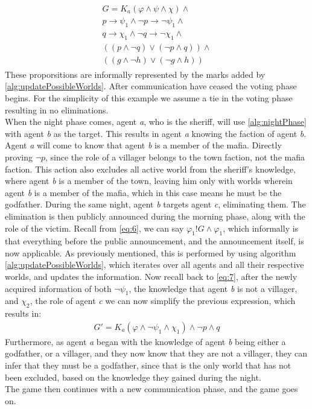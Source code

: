 \begin{align}
	\begin{split}
		G = K_a(\varphi \land \psi \land\chi)\land                      \\
		p \rightarrow \psi_1 \land \neg p \rightarrow \neg \psi_1 \land \\
		q \rightarrow \chi_1 \land \neg q \rightarrow \neg \chi_1 \land \\
		((p \land \neg q) \lor (\neg p \land q)) \land                  \\
		((g \land \neg h) \lor (\neg g \land h))
		\label{eq:7}
	\end{split}
\end{align}
These proporsitions are informally represented by the marks added by \cref{alg:updatePossibleWorlds}. After communication have ceased the voting phase begins. For the simplicity of this example we assume a tie in the voting phase resulting in no eliminations.  \\
When the night phase comes, agent \textit{a}, who is the sheriff, will use \cref{alg:nightPhase} with agent \textit{b} as the target. This results in agent \textit{a} knowing the faction of agent \textit{b}. Agent
\textit{a} will come to know that agent \textit{b} is a member of the mafia.
Directly proving $\neg p$, since the role of a villager belongs to the town
faction, not the mafia faction. This action also excludes all active world from
the sheriff's knowledge, where agent \textit{b} is a member of the town,
leaving him only with worlds wherein agent \textit{b} is a member of the mafia, which in this
case means he must be the godfather. During the same night, agent \textit{b}
targets agent \textit{c}, eliminating them. The elimination is then publicly announced
during the morning phase, along with the role of the victim. Recall from
\cref{eq:6}, we can say $\varphi_1!G\land\varphi_1$, which informally is that
everything before the public announcement, and the announcement itself, is now
applicable. As previously mentioned, this is performed by using algorithm
\ref{alg:updatePossibleWorlds}, which iterates over all agents and all their
respective worlds, and updates the information. Now recall back to \cref{eq:7},
after the newly acquired information of both $\neg \psi_1$, the knowledge that
agent \textit{b} is not a villager, and $\chi_2$, the role of agent
\textit{c} we can now simplify the previous expression, which results in:
\begin{align}
	G' = K_a(\varphi \land \neg \psi_1 \land \chi_1) \land \neg p \land q
\end{align}
Furthermore, as agent \textit{a} began with the knowledge of agent \textit{b}
being either a godfather, or a villager, and they now know that they are not a
villager, they can infer that they must be a godfather, since that is the only
world that has not been excluded, based on the knowledge they gained during the
night. \\
The game then continues with a new communication phase, and the game goes on.
